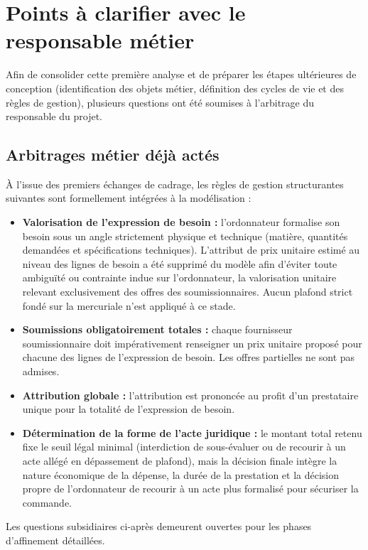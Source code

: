 \section{Points à clarifier avec le responsable métier}

Afin de consolider cette première analyse et de préparer les étapes ultérieures de conception (identification des objets métier, définition des cycles de vie et des règles de gestion), plusieurs questions ont été soumises à l'arbitrage du responsable du projet.

\subsection*{Arbitrages métier déjà actés}

À l'issue des premiers échanges de cadrage, les règles de gestion structurantes suivantes sont formellement intégrées à la modélisation :
\begin{itemize}
  \item \textbf{Valorisation de l'expression de besoin :} l'ordonnateur formalise son besoin sous un angle strictement physique et technique (matière, quantités demandées et spécifications techniques). L'attribut de prix unitaire estimé au niveau des lignes de besoin a été supprimé du modèle afin d'éviter toute ambiguïté ou contrainte indue sur l'ordonnateur, la valorisation unitaire relevant exclusivement des offres des soumissionnaires. Aucun plafond strict fondé sur la mercuriale n'est appliqué à ce stade.
  \item \textbf{Soumissions obligatoirement totales :} chaque fournisseur soumissionnaire doit impérativement renseigner un prix unitaire proposé pour chacune des lignes de l'expression de besoin. Les offres partielles ne sont pas admises.
  \item \textbf{Attribution globale :} l'attribution est prononcée au profit d'un prestataire unique pour la totalité de l'expression de besoin.
  \item \textbf{Détermination de la forme de l'acte juridique :} le montant total retenu fixe le seuil légal minimal (interdiction de sous-évaluer ou de recourir à un acte allégé en dépassement de plafond), mais la décision finale intègre la nature économique de la dépense, la durée de la prestation et la décision propre de l'ordonnateur de recourir à un acte plus formalisé pour sécuriser la commande.
\end{itemize}

Les questions subsidiaires ci-après demeurent ouvertes pour les phases d'affinement détaillées.

